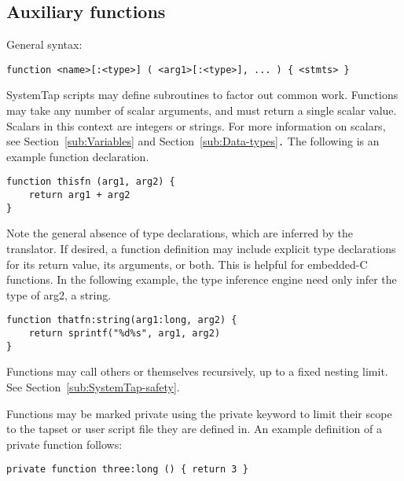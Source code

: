 \documentclass[twoside,english]{article}
\newenvironment{vindent}
{\begin{list}{}{\setlength{\listparindent}{6pt}}
\item[]}
{\end{list}}
\begin{document}
\subsection{Auxiliary functions\label{sub:Auxiliary-functions}}
General syntax:

\begin{vindent}
\begin{verbatim}
function <name>[:<type>] ( <arg1>[:<type>], ... ) { <stmts> }
\end{verbatim}
\end{vindent}
SystemTap scripts may define subroutines to factor out common work. Functions
may take any number of scalar arguments, and must return a single scalar
value. Scalars in this context are integers or strings. For more information
on scalars, see Section~\ref{sub:Variables} and Section~\ref{sub:Data-types}\texttt{.}
The following is an example function declaration.

\begin{vindent}
\begin{verbatim}
function thisfn (arg1, arg2) {
    return arg1 + arg2
}
\end{verbatim}
\end{vindent}

Note the general absence of type declarations, which are inferred by the
translator. If desired, a function definition may include explicit type declarations
for its return value, its arguments, or both. This is helpful for embedded-C
functions. In the following example, the type inference engine need only
infer the type of arg2, a string.

\begin{vindent}
\begin{verbatim}
function thatfn:string(arg1:long, arg2) {
    return sprintf("%d%s", arg1, arg2)
}
\end{verbatim}
\end{vindent}

Functions may call others or themselves recursively, up to a fixed nesting
limit. See Section~\ref{sub:SystemTap-safety}.

Functions may be marked private using the private keyword to limit their scope
to the tapset or user script file they are defined in. An example definition of
a private function follows:

\begin{vindent}
\begin{verbatim}
private function three:long () { return 3 }
\end{verbatim}
\end{vindent}
\end{document}
